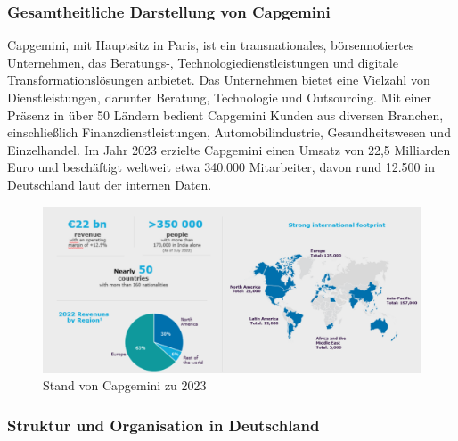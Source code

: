 \documentclass[a4paper, 12pt]{scrartcl}
\begin{document}
	\subsubsection{Gesamtheitliche Darstellung von Capgemini} %
Capgemini, mit Hauptsitz in Paris, ist ein transnationales, börsennotiertes Unternehmen, das Beratungs-, Technologiedienstleistungen und digitale Transformationslösungen anbietet. Das Unternehmen bietet eine Vielzahl von Dienstleistungen, darunter Beratung, Technologie und Outsourcing. Mit einer Präsenz in über 50 Ländern bedient Capgemini Kunden aus diversen Branchen, einschließlich Finanzdienstleistungen, Automobilindustrie, Gesundheitswesen und Einzelhandel. Im Jahr 2023 erzielte Capgemini einen Umsatz von 22,5 Milliarden Euro und beschäftigt weltweit etwa 340.000 Mitarbeiter, davon rund 12.500 in Deutschland laut der internen Daten.
	\begin{figure}[h!]
		\begin{center}
			\includegraphics[width=12cm]{CApgemini zahlen.png}
			\caption{Stand von Capgemini zu 2023}
			\label{Stand von Capgemini}
		\end{center}
	\end{figure}
	\subsubsection{Struktur und Organisation in Deutschland}
\end{document}

